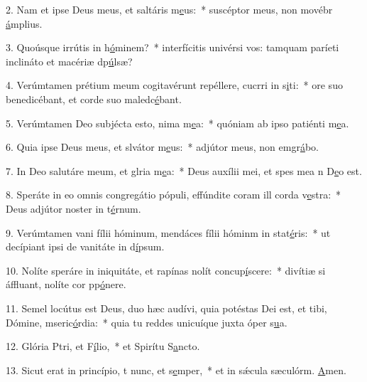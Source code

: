 2. Nam et ipse Deus meus, et saltáris m\uline{e}us:~* suscéptor meus, non movébr \uline{á}mplius.\par 
3. Quoúsque irrútis in h\uline{ó}minem?~* interfícitis univérsi vos: tamquam paríeti inclináto et macériæ dp\uline{ú}lsæ?\par 
4. Verúmtamen prétium meum cogitavérunt repéllere, cucrri in s\uline{i}ti:~* ore suo benedicébant, et corde suo maledc\uline{é}bant.\par 
5. Verúmtamen Deo subjécta esto, nima m\uline{e}a:~* quóniam ab ipso patiénti m\uline{e}a.\par 
6. Quia ipse Deus meus, et slvátor m\uline{e}us:~* adjútor meus, non emgr\uline{á}bo.\par 
7. In Deo salutáre meum, et glria m\uline{e}a:~* Deus auxílii mei, et spes mea n D\uline{e}o est.\par 
8. Speráte in eo omnis congregátio pópuli, effúndite coram ill corda v\uline{e}stra:~* Deus adjútor noster in t\uline{é}rnum.\par 
9. Verúmtamen vani fílii hóminum, mendáces fílii hóminm in stat\uline{é}ris:~* ut decípiant ipsi de vanitáte in d\uline{í}psum.\par 
10. Nolíte speráre in iniquitáte, et rapínas nolít concup\uline{í}scere:~* divítiæ si áffluant, nolíte cor pp\uline{ó}nere.\par 
11. Semel locútus est Deus, duo hæc audívi, quia potéstas Dei est, et tibi, Dómine, mseric\uline{ó}rdia:~* quia tu reddes unicuíque juxta óper s\uline{u}a.\par 
12. Glória Ptri, et F\uline{í}lio,~* et Spirítu S\uline{a}ncto.\par 
13. Sicut erat in princípio, t nunc, et s\uline{e}mper,~* et in sǽcula sæculórm. \uline{A}men.\par 

